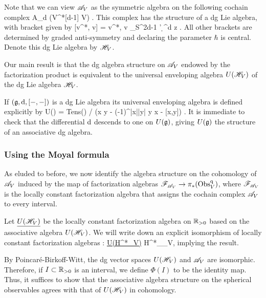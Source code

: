 Note that we can view $\mathscr A_V$ as the symmetric algebra on the following cochain complex
\ben
A_d \tensor (V^*[d-1] \tensor V) \oplus \CC \cdot \hbar .
\een
This complex has the structure of a dg Lie algebra, with bracket given by
\be\label{HV bracket}
[\alpha \tensor v^*, \alpha \tensor v] = \hbar \<v^*, v\> \oint_{S^{2d-1}} \alpha \wedge \alpha'  \d^d z .
\ee
All other brackets are determined by graded anti-symmetry and declaring the parameter $\hbar$ is central.
Denote this dg Lie algebra by $\mathscr H_V$. 

Our main result is that the dg algebra structure on $\mathscr A_V$ endowed by the factorization product is equivalent to the universal enveloping algebra $U(\mathscr H_V)$ of the dg Lie algebra $\mathscr H_V$.

\begin{rmk}
If $(\mathfrak g, {\rm d}, [-,-])$ is a dg Lie algebra its universal enveloping algebra is defined explicitly by 
\ben
U(\fg) = {\rm Tens}(\fg) / (x \tensor y - (-1)^{|x||y|} y \tensor x - [x,y]) .
\een
It is immediate to check that the differential ${\rm d}$ descends to one on $U(\mathfrak g)$, giving $U(\mathfrak g)$ the structure of an associative dg algebra.
\end{rmk}

\subsubsection{Using the Moyal formula}

As eluded to before, we now identify the algebra structure on the cohomology of $\mathscr A_V$
induced by the map of factorization algebras $\mathscr F_{\mathscr A_V} \to \pi_*({\rm Obs}_V^{\rm q})$, where $\mathscr F_{\mathscr A_V}$ is the locally constant factorization algebra that assigns the cochain complex $\mathscr A_V$ to every interval.

Let $\underline{U(\mathscr H_V)}$ be the locally constant factorization algebra on $\mathbb R_{>0}$ based on the associative algebra $U(\mathscr H_V)$. 
We will write down an explicit isomorphism of locally constant factorization algebras
\ben
\Phi : \ul{U(H^*\sH_V)} \to H^*\sF_{\sA_V},
\een
implying the result. 

By Poincar\'{e}-Birkoff-Witt, the dg vector spaces $U(\mathscr H_V)$ and $\mathscr A_V$ are isomorphic. 
Therefore, if $I \subset \mathbb R_{>0}$ is an interval, we define $\Phi(I)$ to be the identity map. 
Thus, it suffices to show that the associative algebra structure on the spherical observables agrees with that of $U(\mathscr H_V)$ in cohomology.


